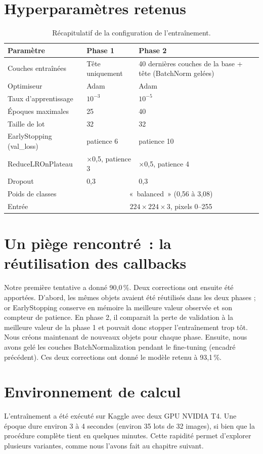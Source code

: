 \section{Hyperparamètres retenus}

\begin{table}[H]
\centering
\caption{Récapitulatif de la configuration de l’entraînement.}\label{tab:hyper}
\small
\begin{tabular}{@{}p{5.2cm}p{4.5cm}p{3.8cm}@{}}
\toprule
\textbf{Paramètre} & \textbf{Phase 1} & \textbf{Phase 2} \\
\midrule
Couches entraînées & Tête uniquement & 40 dernières couches de la base + tête (BatchNorm gelées) \\
Optimiseur & Adam & Adam \\
Taux d’apprentissage & $10^{-3}$ & $10^{-5}$ \\
Époques maximales & 25 & 40 \\
Taille de lot & 32 & 32 \\
EarlyStopping (val\_loss) & patience 6 & patience 10 \\
ReduceLROnPlateau & ×0,5, patience 3 & ×0,5, patience 4 \\
Dropout & 0,3 & 0,3 \\
Poids de classes & \multicolumn{2}{c}{«~balanced~» (0,56 à 3,08)} \\
Entrée & \multicolumn{2}{c}{$224\times224\times3$, pixels 0--255} \\
\bottomrule
\end{tabular}
\end{table}

\section{Un piège rencontré~: la réutilisation des callbacks}

Notre première tentative a donné 90,0\,\%. Deux corrections ont ensuite été apportées. D’abord, les mêmes objets  avaient été réutilisés dans les deux phases ; or EarlyStopping conserve en mémoire la meilleure valeur observée et son compteur de patience. En phase 2, il comparait la perte de validation à la meilleure valeur de la phase 1 et pouvait donc stopper l’entraînement trop tôt. Nous créons maintenant de nouveaux objets pour chaque phase. Ensuite, nous avons gelé les couches BatchNormalization pendant le fine-tuning (encadré précédent). Ces deux corrections ont donné le modèle retenu à 93,1\,\%.

\section{Environnement de calcul}

L’entraînement a été exécuté sur Kaggle avec deux GPU NVIDIA T4. Une époque dure environ 3 à 4 secondes (environ 35 lots de 32 images), si bien que la procédure complète tient en quelques minutes. Cette rapidité permet d’explorer plusieurs variantes, comme nous l’avons fait au chapitre suivant.
